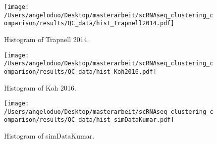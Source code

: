 \documentclass[12pt, a4paper]{article}\usepackage[]{graphicx}\usepackage[]{color}
\begin{document}
\begin{figure}[!h]
\centering

\texttt{[image: /Users/angeloduo/Desktop/masterarbeit/scRNAseq\_clustering\_comparison/results/QC\_data/hist\_Trapnell2014.pdf]}
\caption{Histogram of Trapnell 2014. }
\label{fig:histtrap}
\end{figure}

\begin{figure}[!h]
\centering

\texttt{[image: /Users/angeloduo/Desktop/masterarbeit/scRNAseq\_clustering\_comparison/results/QC\_data/hist\_Koh2016.pdf]}
\caption{Histogram of Koh 2016. }
\label{fig:histkoh}
\end{figure}


\begin{figure}[!h]
\centering

\texttt{[image: /Users/angeloduo/Desktop/masterarbeit/scRNAseq\_clustering\_comparison/results/QC\_data/hist\_simDataKumar.pdf]}
\caption{Histogram of simDataKumar. }
\label{fig:histsim}
\end{figure}
\end{document}
